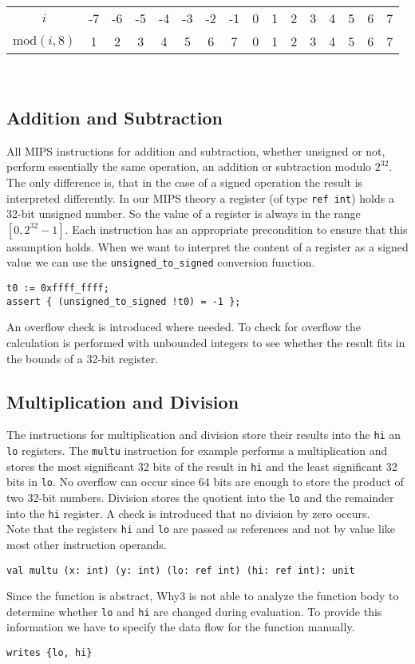 \begin{tabular} {|c||c|c|c|c|c|c|c|c|c|c|c|c|c|c|c|}
 \hline
 $i$ & -7 & -6 & -5 & -4 & -3 & -2 & -1 & 0 & 1 & 2 & 3 & 4 & 5 & 6 & 7 \\
 $\mathrm{mod}(i, 8)$ & 1 & 2 & 3 & 4 & 5 & 6 & 7 & 0 & 1 & 2 & 3 & 4 & 5 & 6 & 7 \\
 \hline
\end{tabular} \\

\subsection{Addition and Subtraction}

All MIPS instructions for addition and subtraction, whether unsigned or not, 
perform essentially the same operation, an addition or subtraction modulo $2^{32}$. 
The only difference is, that in the case of a signed operation the result is interpreted differently. 
In our MIPS theory a register (of type
\verb"ref int") holds a 32-bit unsigned number. So the value of a register is always in the range $[0, 2^{32}-1]$. 
Each instruction has an appropriate precondition to ensure that this assumption holds. 
When we want to interpret the
content of a register as a signed value we can use the \verb"unsigned_to_signed" conversion function.
\begin{lstlisting}
t0 := 0xffff_ffff;
assert { (unsigned_to_signed !t0) = -1 }; 
\end{lstlisting}  
An overflow check is introduced where needed. To check for overflow the calculation is performed with unbounded integers to
see whether the result fits in the bounds of a 32-bit register.

\subsection{Multiplication and Division}

The instructions for multiplication and division store their results into the \verb"hi" an \verb"lo" registers. The \verb"multu" 
instruction for example performs a multiplication and stores the most significant 32 bits of the result in \verb"hi"
and the least significant 32 bits in \verb"lo". No overflow can occur since 64 bits are enough to store the product of
 two 32-bit numbers. Division stores the quotient into the \verb"lo" and the remainder into the \verb"hi" register. 
 A check is introduced that no division by zero occurs.\\
Note that the registers \verb"hi" and \verb"lo" are passed as references and not by value like most other instruction operands.
\begin{lstlisting}
val multu (x: int) (y: int) (lo: ref int) (hi: ref int): unit
\end{lstlisting}
Since the function is abstract, Why3 is not able to analyze the function body to determine whether \verb"lo" and \verb"hi" are
changed during evaluation. To provide this information we have to specify the data flow for the function manually.
\begin{lstlisting}
writes {lo, hi}
\end{lstlisting}

